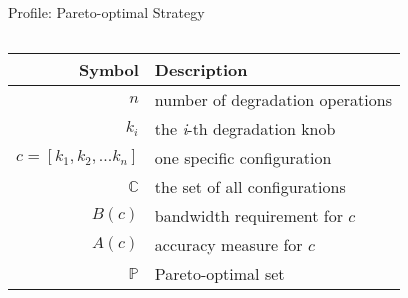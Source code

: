 \begin{frame}{Profile: Pareto-optimal Strategy}
\begin{columns}
    \begin{column}{0.59\linewidth}
      \scriptsize
      \begin{table}
        \centering
        \begin{tabular}{r l}
          \toprule
          \textbf{Symbol} & \textbf{Description} \\
          \midrule
          $n$ & number of degradation operations \\
          $k_i$ & the \textit{i}-th degradation knob \\
          $c = [k_{1}, k_{2}, ... k_{n}]$ & one specific configuration \\
          $\mathbb{C}$ & the set of all configurations \\
          \midrule
          $B(c)$ & bandwidth requirement for $c$ \\
          $A(c)$ & accuracy measure for $c$ \\
          $\mathbb{P}$ & Pareto-optimal set \\
          \bottomrule
        \end{tabular}
      \end{table}

        
    \end{column}
  \end{columns}
\end{frame}

